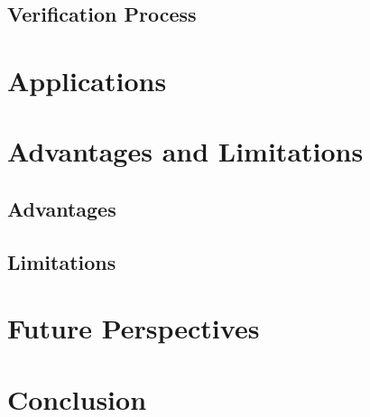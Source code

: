 \documentclass[12pt]{article}
\begin{document}
\subsection{Verification Process}

\section{Applications}

\section{Advantages and Limitations}
\subsection{Advantages}
\subsection{Limitations}

\section{Future Perspectives}

\section{Conclusion}

% 
% 
\end{document}
